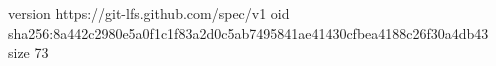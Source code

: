 version https://git-lfs.github.com/spec/v1
oid sha256:8a442c2980e5a0f1c1f83a2d0c5ab7495841ae41430cfbea4188c26f30a4db43
size 73
